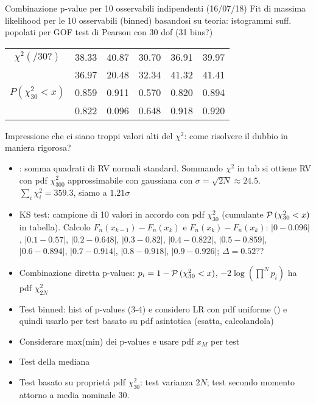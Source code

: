 \begin{wordonframe}{Combinazione p-value per 10 osservabili indipendenti (16/07/18)}
	Fit di massima likelihood per le 10 osservabili (binned) basandosi su teoria: istogrammi suff. popolati per GOF test di Pearson con 30 dof (31 bins?)
	\begin{table}[h!]
		\centering
		\begin{tabular}{||cccccc||} 
			$\chi^2(/30?)$&38.33&40.87&30.70&36.91&39.97\\
			&36.97&20.48&32.34&41.32&41.41\\
			$P(\chi^2_{30}<x)$&0.859&0.911&0.570&0.820&0.894\\
			&0.822&0.096&0.648&0.918&0.920\\
		\end{tabular}
	\end{table}
	Impressione che ci siano troppi valori alti del $\chi^2$: come risolvere il dubbio in maniera rigorosa?
	\begin{itemize}
	\item {}: somma quadrati di RV normali standard.
			Sommando $\chi^2$ in tab si ottiene RV con pdf $\chi^2_{300}$ approssimabile con gaussiana con $\sigma=\sqrt{2N}\approx24.5$.
			$\sum_i\chi^2_i=359.3$, siamo a $1.21\sigma$
	\item KS test: campione di 10 valori in accordo con pdf $\chi^2_{30}$ (cumulante $\operatorname{\mathcal{P}}{(\chi^2_{30}<x)}$ in tabella). Calcolo $F_n(x_{k-1})-F_n(x_k)$ e $F_n(x_k)-F_n(x_k)$:  $|0-0.096|$, $|0.1-0.57|$, $|0.2-0.648|$, $|0.3-0.82|$, $|0.4-0.822|$, $|0.5-0.859|$, $|0.6-0.894|$, $|0.7-0.914|$, $|0.8-0.918|$, $|0.9-0.926|$; $\Delta=0.52$??
	\item Combinazione diretta p-values: $p_i=1-\operatorname{\mathcal{P}}{(\chi^2_{30}<x)}$,  $-2\log{(\prod^Np_i)}$ ha pdf $\chi^2_{2N}$
	\item Test binned: hist of p-values (3-4) e considero LR con pdf uniforme () e quindi usarlo per test basato su pdf asintotica (esatta, calcolandola)
	\item Considerare max(min) dei p-values e usare pdf $x_M$ per test
	\item Test della mediana
	\item Test basato su propriet\'a pdf $\chi^2_{30}$: test varianza $2N$; test secondo momento attorno a media nominale 30.
\end{itemize}
\end{wordonframe}

